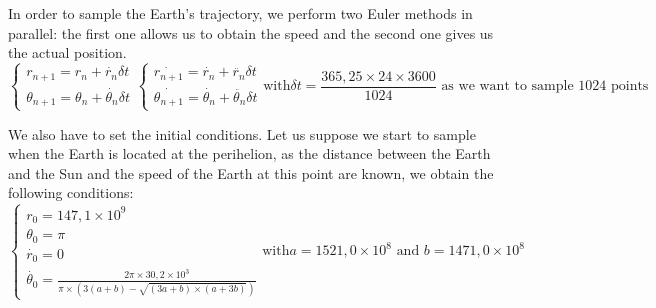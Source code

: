 In order to sample the Earth's trajectory, we perform two Euler methods in parallel: the first one allows us to obtain the speed and the second one gives us the actual position.
\[
\begin{equation}
    \begin{cases}
    r_{n+1} = r_{n} + \dot{r_{n}} \delta t\\
    \theta_{n+1} = \theta_{n} + \dot{\theta_{n}} \delta t
\end{cases}
\end{equation}

\begin{equation}
    \begin{cases}
    \dot{r_{n+1}} = \dot{r_{n}} + \ddot{r_{n}} \delta t\\
    \dot{\theta_{n+1}} = \dot{\theta_{n}} + \ddot{\theta_{n}} \delta t
    \end{cases}
\end{equation}

\text{with}
\delta t = \frac{365,25 \times 24 \times 3600}{1024}
\text{ as we want to sample 1024 points}
\]

We also have to set the initial conditions. Let us suppose we start to sample when the Earth is located at the perihelion, as the distance between the Earth and the Sun and the speed of the Earth at this point are known, we obtain the following conditions:
\[
\begin{equation}
    \begin{cases}
    r_{0} = 147,1 \times 10^{9}\\
    \theta_{0} = \pi\\
    \dot{r_{0}} = 0\\
    \dot{\theta_{0}} = \frac{2\pi \times 30,2 \times 10^{3}}{\pi \times (3 (a + b) - \sqrt{(3a + b) \times (a + 3b)})}
    \end{cases}
\end{equation}

\text{with}
a = 1521,0 \times 10^{8}
\text{ and }
b = 1471,0 \times 10^{8}
\]